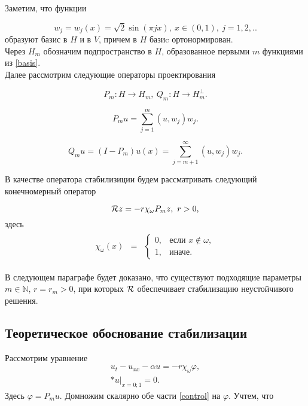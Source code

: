 Заметим, что функции

\begin{equation}\label{basis}
    w_j = w_j(x) = \sqrt{2}\sin{(\pi j x)}, \ x \in (0, 1), \ j=1, 2, ..
\end{equation}
образуют базис в $H$ и в $V$, причем в $H$ базиc ортонормирован.\\
Через $H_m$ обозначим подпространство в $H$, образованное первыми $m$ функциями 
из \eqref{basis}.\\

Далее рассмотрим следующие операторы проектирования

$$P_m : H \rightarrow H_m, \ Q_m : H \rightarrow H_m^{\perp}.$$

\begin{equation}
    P_m u = \sum \limits_{j=1}^{m} {(u, w_j) w_j}.
\end{equation}

\begin{equation}
    Q_m u = (I - P_m)u(x) = \sum \limits_{j=m + 1}^{\infty} {(u, w_j) w_j}.
\end{equation}

В качестве оператора стабилизиции будем рассматривать следующий конечномерный
оператор

$$\mathcal{R}{z} = -r\chi_{\omega}P_mz, \ r > 0,$$
здесь
\begin{gather*}
    \begin{matrix}
        \chi_{\omega}(x) & =
        & \left\{
        \begin{matrix}
            0, & \mbox{если } x \notin \omega, \\
            1, & \mbox{иначе. }
        \end{matrix} \right.
    \end{matrix}
\end{gather*}

В следующем параграфе будет доказано, что существуют подходящие параметры 
$m \in \mathbb{N}$, $r = r_m > 0$, при которых $\mathcal{R}{}$ обеспечивает 
стабилизацию неустойчивого решения.

\subsection{Теоретическое обоснование стабилизации}
\vspace{1em}

Рассмотрим уравнение
\begin{gather}\label{control}
    u_t - u_{xx} - \alpha u = -r\chi_{\omega}\varphi,\\*
    u|_{x = 0;1} = 0.
\end{gather}
Здесь $\varphi = P_mu$. Домножим скалярно обе части \eqref{control} на
$\varphi$. Учтем, что

